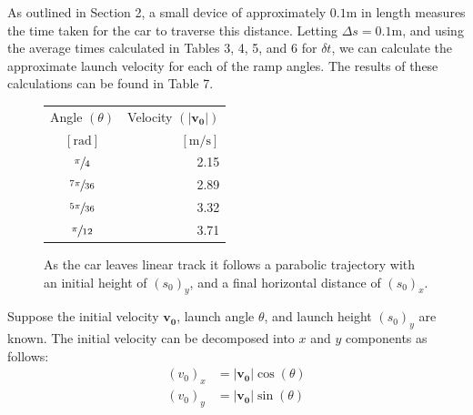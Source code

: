 \documentclass[a4paper]{article}
\begin{document}
As outlined in Section 2, a small device of approximately $0.1\si{\meter}$ in length measures the time taken for the car to traverse this distance. Letting $\Delta s = 0.1\si{\meter}$, and using the average times calculated in Tables 3, 4, 5, and 6 for $\delta t$, we can calculate the approximate launch velocity for each of the ramp angles. The results of these calculations can be found in Table 7.
\begin{figure}[h]
	\begin{minipage}{0.45\textwidth}
		\centering
		\begin{tabular}{cr}
			\toprule
			Angle $(\theta)$ & Velocity $(|\boldsymbol{v_0}|)$ \\
			$[\si{\radian}]$ & $[\si{\meter\per\second}]$ \\
			\midrule
			$\sfrac{\pi}{4}$ & 2.15 \\
			$\sfrac{7\pi}{36}$ & 2.89 \\
			$\sfrac{5\pi}{36}$ & 3.32 \\
			$\sfrac{\pi}{12}$ & 3.71 \\
			\bottomrule
		\end{tabular}
	\end{minipage}
	\hspace{0.25cm}
	\begin{minipage}{0.52\textwidth}
		\centering
		\caption{As the car leaves linear track it follows a parabolic trajectory with an initial height of $(s_0)_y$, and a final horizontal distance of $(s_0)_x$.}
	\end{minipage}
\end{figure}

Suppose the initial velocity $\boldsymbol{v_0}$, launch angle $\theta$, and launch height $(s_0)_y$ are known. The initial velocity can be decomposed into $x$ and $y$ components as follows:
\begin{align}
(v_0)_x &= |\boldsymbol{v_0}|\cos(\theta)\\
(v_0)_y &= |\boldsymbol{v_0}|\sin(\theta)
\end{align}
\end{document}
